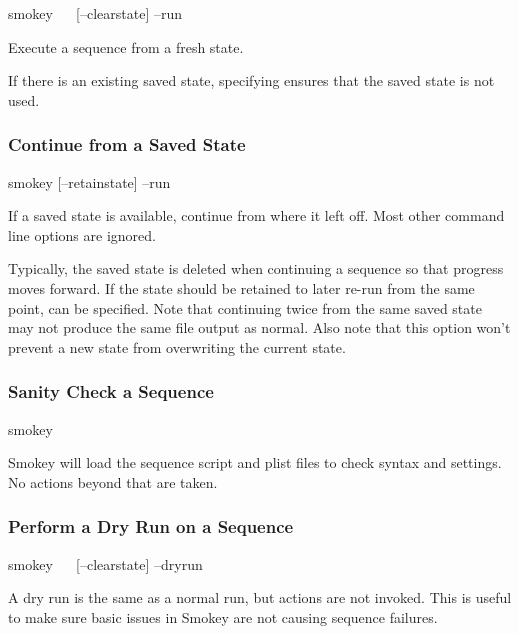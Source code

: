\begin{CommandLine}
smokey ~~ [--clearstate] --run
\end{CommandLine}

Execute a sequence from a fresh state.

If there is an existing saved state, specifying  ensures
that the saved state is not used.

\subsubsection{Continue from a Saved State}

\begin{CommandLine}
smokey [--retainstate] --run
\end{CommandLine}

If a saved state is available, continue from where it left off.  Most other
command line options are ignored.

Typically, the saved state is deleted when continuing a sequence so that
progress moves forward.  If the state should be retained to later re-run from
the same point,  can be specified.  Note that continuing
twice from the same saved state may not produce the same file output as normal.
Also note that this option won't prevent a new state from overwriting the
current state.

\subsubsection{Sanity Check a Sequence}

\begin{CommandLine}
smokey ~~
\end{CommandLine}

Smokey will load the sequence script and plist files to check syntax and
settings.  No actions beyond that are taken.

\subsubsection{Perform a Dry Run on a Sequence}

\begin{CommandLine}
smokey ~~ [--clearstate] --dryrun
\end{CommandLine}

A dry run is the same as a normal run, but actions are not invoked.  This is
useful to make sure basic issues in Smokey are not causing sequence failures.

